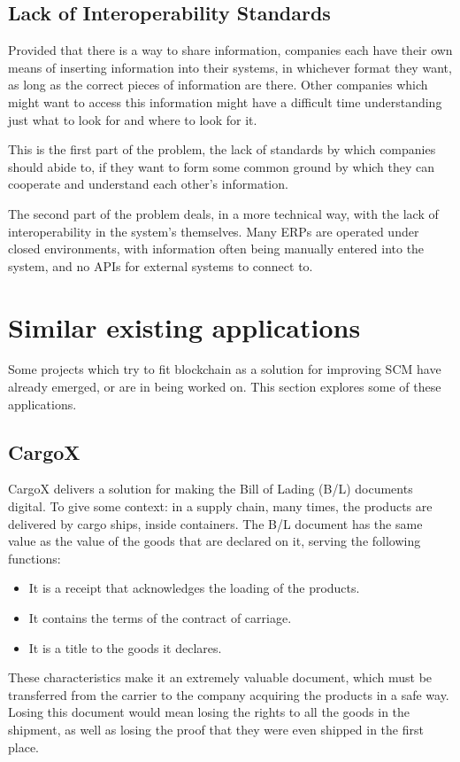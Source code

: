 \subsection{Lack of Interoperability Standards}
Provided that there is a way to share information, companies each have their own means of inserting information into their systems, in whichever format they want, as long as the correct pieces of information are there. Other companies which might want to access this information might have a difficult time understanding just what to look for and where to look for it. 

This is the first part of the problem, the lack of standards by which companies should abide to, if they want to form some common ground by which they can cooperate and understand each other's information. 

The second part of the problem deals, in a more technical way, with the lack of interoperability in the system's themselves. Many ERPs are operated under closed environments, with information often being manually entered into the system, and no APIs for external systems to connect to.

\section{Similar existing applications}
Some projects which try to fit blockchain as a solution for improving SCM have already emerged, or are in being worked on. This section explores some of these applications.



\subsection{CargoX}
CargoX delivers a solution for making the Bill of Lading (B/L) documents digital.  To give some context: in a supply chain, many times, the products are delivered by cargo ships, inside containers. The B/L document has the same value as the value of the goods that are declared on it, serving the following functions:
\begin{itemize}
\item It is a receipt that acknowledges the loading of the products.
\item It contains the terms of the contract of carriage.
\item It is a title to the goods it declares.
\end{itemize}
These characteristics make it an extremely valuable document, which must be transferred from the carrier to the company acquiring the products in a safe way. Losing this document would mean losing the rights to all the goods in the shipment, as well as losing the proof that they were even shipped in the first place.

